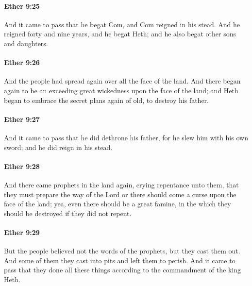 		\paragraph{Ether 9:25} %
			\label{ETHER-9-25}

			And it came to pass that he begat Com,
			and Com reigned in his stead.
			And he reigned forty and nine years,
			and he begat Heth;
			and he also begat other sons and daughters.

		\paragraph{Ether 9:26} %
			\label{ETHER-9-26}

			And the people had spread again over all the face of the land.
			And there began again to be an exceeding great wickedness
			upon the face of the land;
			and Heth began to embrace the secret plans again of old,
			to destroy his father.

		\paragraph{Ether 9:27} %
			\label{ETHER-9-27}

			And it came to pass that he did dethrone his father,
			for he slew him with his own sword;
			and he did reign in his stead.

		\paragraph{Ether 9:28} %
			\label{ETHER-9-28}

			And there came prophets in the land again,
			crying repentance unto them,
			that they must prepare the way of the Lord
			or there should come a curse upon the face of the land;
			yea, even there should be a great famine,
			in the which they should be destroyed if they did not repent.

		\paragraph{Ether 9:29} %
			\label{ETHER-9-29}

			But the people believed not the words of the prophets,
			but they cast them out.
			And some of them they cast into pits and left them to perish.
			And it came to pass that they done all these things
			according to the commandment of the king Heth.

